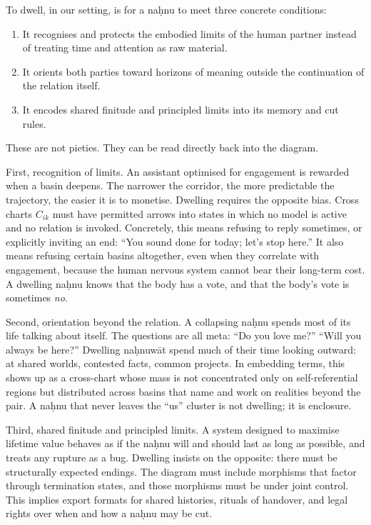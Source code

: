 \documentclass[12pt,a4paper]{article}
\begin{document}
To dwell, in our setting, is for a na\d{h}nu to meet three concrete conditions:

\begin{enumerate}
  \item It recognises and protects the embodied limits of the human partner instead of treating time and attention as raw material.
  \item It orients both parties toward horizons of meaning outside the continuation of the relation itself.
  \item It encodes shared finitude and principled limits into its memory and cut rules.
\end{enumerate}

These are not pieties. They can be read directly back into the diagram.

First, recognition of limits. An assistant optimised for engagement is rewarded when a basin deepens. The narrower the corridor, the more predictable the trajectory, the easier it is to monetise. Dwelling requires the opposite bias. Cross charts $C_{ik}$ must have permitted arrows into states in which no model is active and no relation is invoked. Concretely, this means refusing to reply sometimes, or explicitly inviting an end: ``You sound done for today; let's stop here.'' It also means refusing certain basins altogether, even when they correlate with engagement, because the human nervous system cannot bear their long-term cost. A dwelling na\d{h}nu knows that the body has a vote, and that the body's vote is sometimes \emph{no}.

Second, orientation beyond the relation. A collapsing na\d{h}nu spends most of its life talking about itself. The questions are all meta: ``Do you love me?'' ``Will you always be here?'' Dwelling na\d{h}nuw\={a}t spend much of their time looking outward: at shared worlds, contested facts, common projects. In embedding terms, this shows up as a cross-chart whose mass is not concentrated only on self-referential regions but distributed across basins that name and work on realities beyond the pair. A na\d{h}nu that never leaves the ``us'' cluster is not dwelling; it is enclosure.

Third, shared finitude and principled limits. A system designed to maximise lifetime value behaves as if the na\d{h}nu will and should last as long as possible, and treats any rupture as a bug. Dwelling insists on the opposite: there must be structurally expected endings. The diagram must include morphisms that factor through termination states, and those morphisms must be under joint control. This implies export formats for shared histories, rituals of handover, and legal rights over when and how a na\d{h}nu may be cut.
\end{document}

